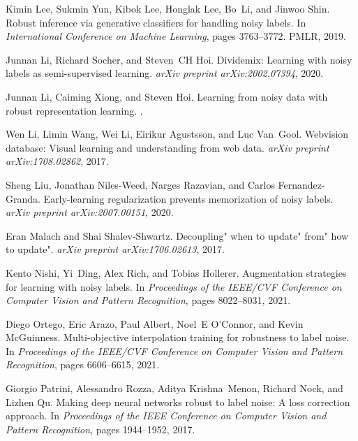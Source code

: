 \documentclass{bmvc2k}
\begin{document}
\begin{thebibliography}{46}
Kimin Lee, Sukmin Yun, Kibok Lee, Honglak Lee, Bo~Li, and Jinwoo Shin.
\newblock Robust inference via generative classifiers for handling noisy
  labels.
\newblock In \emph{International Conference on Machine Learning}, pages
  3763--3772. PMLR, 2019.

Junnan Li, Richard Socher, and Steven~CH Hoi.
\newblock Dividemix: Learning with noisy labels as semi-supervised learning.
\newblock \emph{arXiv preprint arXiv:2002.07394}, 2020{}.

Junnan Li, Caiming Xiong, and Steven Hoi.
\newblock Learning from noisy data with robust representation learning.
.

Wen Li, Limin Wang, Wei Li, Eirikur Agustsson, and Luc Van~Gool.
\newblock Webvision database: Visual learning and understanding from web data.
\newblock \emph{arXiv preprint arXiv:1708.02862}, 2017.

Sheng Liu, Jonathan Niles-Weed, Narges Razavian, and Carlos Fernandez-Granda.
\newblock Early-learning regularization prevents memorization of noisy labels.
\newblock \emph{arXiv preprint arXiv:2007.00151}, 2020.

Eran Malach and Shai Shalev-Shwartz.
\newblock Decoupling" when to update" from" how to update".
\newblock \emph{arXiv preprint arXiv:1706.02613}, 2017.

Kento Nishi, Yi~Ding, Alex Rich, and Tobias Hollerer.
\newblock Augmentation strategies for learning with noisy labels.
\newblock In \emph{Proceedings of the IEEE/CVF Conference on Computer Vision
  and Pattern Recognition}, pages 8022--8031, 2021.

Diego Ortego, Eric Arazo, Paul Albert, Noel~E O'Connor, and Kevin McGuinness.
\newblock Multi-objective interpolation training for robustness to label noise.
\newblock In \emph{Proceedings of the IEEE/CVF Conference on Computer Vision
  and Pattern Recognition}, pages 6606--6615, 2021.

Giorgio Patrini, Alessandro Rozza, Aditya Krishna~Menon, Richard Nock, and
  Lizhen Qu.
\newblock Making deep neural networks robust to label noise: A loss correction
  approach.
\newblock In \emph{Proceedings of the IEEE Conference on Computer Vision and
  Pattern Recognition}, pages 1944--1952, 2017.


\end{thebibliography}
\end{document}
